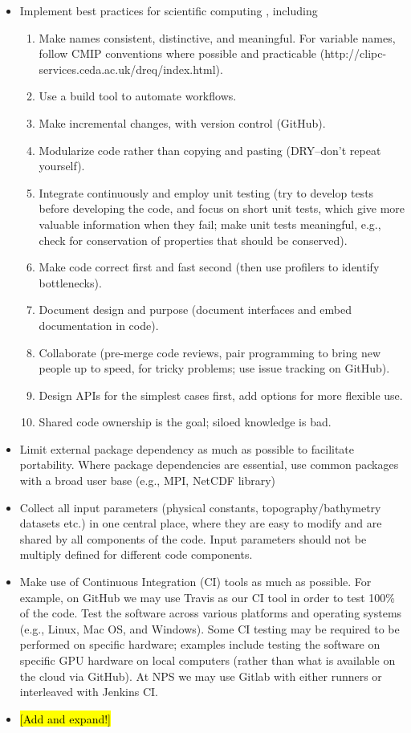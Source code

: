\documentclass{article}
\begin{document}
\begin{itemize}
    \item Implement best practices for scientific computing \citep[e.g.,][]{Wilson14a}, including
        \begin{enumerate}
            \item Make names consistent, distinctive, and meaningful. For variable names, follow CMIP conventions where possible and practicable (http://clipc-services.ceda.ac.uk/dreq/index.html).
            \item Use a build tool to automate workflows.
            \item Make incremental changes, with version control (GitHub).
            \item Modularize code rather than copying and pasting (DRY--don't repeat yourself).
            \item Integrate continuously and employ unit testing (try to develop tests before developing the code, and focus on short unit tests, which give more valuable information when they fail; make unit tests meaningful, e.g., check for conservation of properties that should be conserved).
            \item Make code correct first and fast second (then use profilers to identify bottlenecks).
            \item Document design and purpose (document interfaces and embed documentation in code).
            \item Collaborate (pre-merge code reviews, pair programming to bring new people up to speed, for tricky problems; use issue tracking on GitHub).
            \item Design APIs for the simplest cases first, add options for more flexible use.
            \item Shared code ownership is the goal; siloed knowledge is bad.
        \end{enumerate}
    \item Limit external package dependency as much as possible to facilitate portability. Where package dependencies are essential, use common packages with a broad user base (e.g., MPI, NetCDF library)
    \item Collect all input parameters (physical constants, topography/bathymetry datasets etc.) in one central place, where they are easy to modify and are shared by all components of the code. Input parameters should not be multiply defined for different code components.
    \item Make use of Continuous Integration (CI) tools as much as possible.  For example, on GitHub we may use Travis as our CI tool in order to test 100\% of the code. Test the software across various platforms and operating systems (e.g., Linux, Mac OS, and Windows).  Some CI testing may be required to be performed on specific hardware; examples include testing the software on specific GPU hardware on local computers (rather than what is available on the cloud via GitHub).  At NPS we may use Gitlab with either runners or interleaved with Jenkins CI.
    \item \hl{[Add and expand!]}
\end{itemize}
\end{document}
